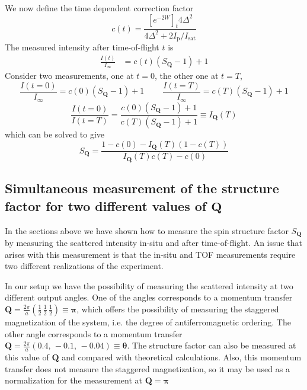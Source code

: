 \documentclass[11pt,letter]{article}
\newcommand{\bv}[1]{\ensuremath{\bm{#1}}}
\newcommand{\iisat}{\ensuremath{I_{\mathrm{p}}/I_{\mathrm{sat}}}}
\newcommand{\itof}{\ensuremath{I_{\infty} }}
\begin{document}
We now define the time dependent correction factor 
\begin{equation}
   c(t) =   \frac{ [e^{-2W}]_{t} 4 \Delta^{2}  } 
           {4 \Delta^{2} + 2 \iisat }  
\end{equation}
The measured intensity after time-of-flight $t$ is 
\begin{equation}
\begin{split} 
 \frac{I(t)}{\itof} 
&  = c(t) ( S_{\bv{Q}} - 1 ) + 1 
\end{split}
\end{equation}
Consider two measurements, one at $t=0$, the other one at $t=T$,
\begin{equation}
 \frac{ I(t=0) }{\itof} =  c(0)( S_{\bv{Q}} -1) + 1 
 \ \ \ \ \ \ \ \ \ \ 
  \frac{ I(t=T) }{\itof} =  c(T)( S_{\bv{Q}} -1) + 1 
\end{equation}
\begin{equation} 
 \frac{ I(t=0)}{ I(t=T)} = 
 \frac{ c(0)( S_{\bv{Q}} - 1 ) + 1}{ c(T)( S_{\bv{Q}} - 1) + 1} 
      \equiv I_{\bv{Q}}(T) 
\end{equation}
which can be solved to give
\begin{equation} 
  S_{\bv{Q}} = \frac{ 1 - c(0) - I_{\bv{Q}}(T)( 1- c(T))}
                    { I_{\bv{Q}}(T)c(T) - c(0) } 
\end{equation}

\subsection{Simultaneous measurement of the structure factor for two different
values of $\bv{Q}$}

In the sections above we have shown how to measure the spin structure factor
$S_{\bv{Q}}$  by measuring the scattered intensity in-situ and after
time-of-flight.  An issue that arises with this measurement is that the in-situ
and TOF measurements require two different realizations of the experiment.  

In our setup we have the possibility of measuring the scattered intensity at
two different output angles.  One of the angles corresponds to a momentum
transfer $\bv{Q} = \frac{2\pi}{a} ( \frac{1}{2}\, \frac{1}{2}\, \frac{1}{2} )
\equiv \bv{\pi}$,  which offers the possibility of measuring the staggered
magnetization of the system, i.e. the degree of antiferromagnetic ordering.
The other angle corresponds to a momentum transfer $\bv{Q} = \frac{2\pi}{a}(
0.4,\, -0.1,\, -0.04 ) \equiv \bv{\theta}$.  The structure factor can also be
measured at this value of $\bv{Q}$ and compared with theoretical calculations.
Also, this momentum transfer does not measure the staggered magnetization, so
it may be used as a normalization for the measurement at $\bv{Q}=\bv{\pi}$
\end{document}
